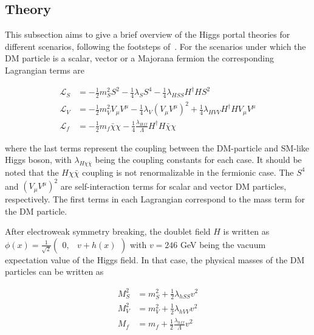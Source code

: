 \subsection{Theory}
\label{subsec:higgs_portal_theory}

This subsection aims to give a brief overview of the Higgs portal theories for different scenarios, following the footsteps of~\cite{Djouadi:2011aa}.
For the scenarios under which the DM particle is a scalar, vector or a Majorana fermion the corresponding Lagrangian terms are 

\begin{equation}
    \begin{split}
        \mathcal{L}_{S} &= -\frac{1}{2} m_{S}^{2} S^{2} - \frac{1}{4} \lambda_{S} S^{4} - \frac{1}{4} \lambda_{HSS} H^{\dag} H S^{2} \\
        \mathcal{L}_{V} &= -\frac{1}{2} m_{V}^{2} V_{\mu} V^{\mu} - \frac{1}{4} \lambda_{V} (V_{\mu} V^{\mu})^{2} + \frac{1}{4} \lambda_{HVV} H^{\dag} H V_{\mu} V^{\mu} \\
        \mathcal{L}_{f} &= -\frac{1}{2} m_{f} \bar{\chi} \chi - \frac{1}{4} \frac{\lambda_{Hff}}{\Lambda} H^{\dag} H \bar{\chi} \chi
    \end{split}
    \label{eq:higgs_portal_lagrangians}
\end{equation}

where the last terms represent the coupling between the DM-particle and SM-like Higgs boson, with $\lambda_{H\chi\bar{\chi}}$ being the coupling constants for each case.
It should be noted that the $H\chi\bar{\chi}$ coupling is not renormalizable in the fermionic case. The $S^{4}$ and $(V_{\mu} V^{\mu})^{2}$ are self-interaction terms
for scalar and vector DM particles, respectively. The first terms in each Lagrangian correspond to the mass term for the DM particle.

After electroweak symmetry breaking, the doublet field $H$ is written as $\phi(x) = \frac{1}{\sqrt{2}} \begin{pmatrix} 0, & v + h(x) \end{pmatrix}$ with $v = 246$ GeV
being the vacuum expectation value of the Higgs field. In that case, the physical masses of the DM particles can be written as~\cite{Djouadi:2011aa}

\begin{equation}
    \begin{split}
        M_{S}^2 &= m_{S}^2 + \frac{1}{2} \lambda_{hSS} v^{2} \\
        M_{V}^2 &= m_{V}^2 + \frac{1}{2} \lambda_{hVV} v^{2} \\
        M_{f}   &= m_{f}   + \frac{1}{2} \frac{\lambda_{hff}}{\Lambda} v^{2}
    \end{split}
\end{equation}

